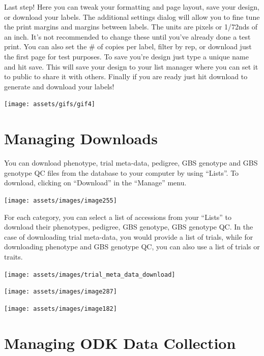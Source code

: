 \documentclass[
  12pt,
]{book}
\begin{document}
Last step! Here you can tweak your formatting and page layout, save your design, or download your labels. The additional settings dialog will allow you to fine tune the print margins and margins between labels. The units are pixels or 1/72nds of an inch. It's not recommended to change these until you've already done a test print. You can also set the \# of copies per label, filter by rep, or download just the first page for test purposes. To save you're design just type a unique name and hit save. This will save your design to your list manager where you can set it to public to share it with others. Finally if you are ready just hit download to generate and download your labels!

\begin{center}\texttt{[image: assets/gifs/gif4]} \end{center}

\hypertarget{managing-downloads}{%
\chapter{Managing Downloads}\label{managing-downloads}}

You can download phenotype, trial meta-data, pedigree, GBS genotype and GBS genotype QC files from the database to your computer by using ``Lists''. To download, clicking on ``Download'' in the ``Manage'' menu.

\begin{center}\texttt{[image: assets/images/image255]} \end{center}

For each category, you can select a list of accessions from your ``Lists'' to download their phenotypes, pedigree, GBS genotype, GBS genotype QC. In the case of downloading trial meta-data, you would provide a list of trials, while for downloading phenotype and GBS genotype QC, you can also use a list of trials or traits.

\begin{center}\texttt{[image: assets/images/trial\_meta\_data\_download]} \end{center}

\begin{center}\texttt{[image: assets/images/image287]} \end{center}

\begin{center}\texttt{[image: assets/images/image182]} \end{center}

\hypertarget{managing-odk-data-collection}{%
\chapter{Managing ODK Data Collection}\label{managing-odk-data-collection}}
\end{document}
